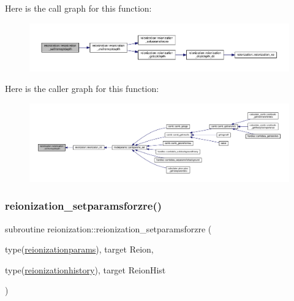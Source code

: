 Here is the call graph for this function\+:
\nopagebreak
\begin{figure}[H]
\begin{center}
\leavevmode
\includegraphics[width=350pt]{namespacereionization_a13fb01c3cb03034262b0447b7527aae9_cgraph}
\end{center}
\end{figure}
Here is the caller graph for this function\+:
\nopagebreak
\begin{figure}[H]
\begin{center}
\leavevmode
\includegraphics[width=350pt]{namespacereionization_a13fb01c3cb03034262b0447b7527aae9_icgraph}
\end{center}
\end{figure}
\mbox{\label{namespacereionization_aee52456a0e9c89ddc33d45ae3d14a484}} 
\subsubsection{\texorpdfstring{reionization\+\_\+setparamsforzre()}{reionization\_setparamsforzre()}}
{\footnotesize\ttfamily subroutine reionization\+::reionization\+\_\+setparamsforzre (\begin{DoxyParamCaption}\item[{type(\mbox{\hyperlink{structreionization_1_1reionizationparams}{reionizationparams}}), target}]{Reion,  }\item[{type(\mbox{\hyperlink{structreionization_1_1reionizationhistory}{reionizationhistory}}), target}]{Reion\+Hist }\end{DoxyParamCaption})}



